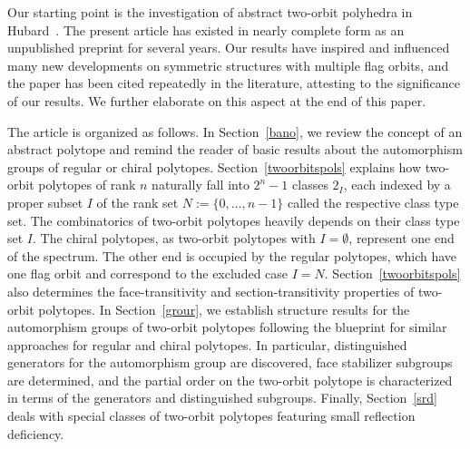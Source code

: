 \documentclass[12pt]{article}
\renewcommand{\>}{\rangle}
\theoremstyle{definition}\newtheorem{definition}{Definition}[section]
\begin{document}

Our starting point is the investigation of abstract two-orbit polyhedra in Hubard~\cite{H2010}. 
The present article has existed in nearly complete form as an unpublished preprint for several years. Our results have inspired and influenced many new developments on symmetric structures with multiple flag orbits, and the paper has been cited repeatedly in the literature, attesting to the significance of our results. We further elaborate on this aspect at the end of this paper.

The article is organized as follows. In Section~\ref{bano}, we review the concept of an abstract polytope and remind the reader of basic results about the automorphism groups of regular or chiral polytopes. Section~\ref{twoorbitspols} explains how two-orbit polytopes of rank $n$ naturally fall into ${2^{n}-1}$ classes $2_I$, each indexed by a proper subset $I$ of the rank set $N:=\{0,\ldots,n-1\}$ called the respective class type set. The combinatorics of two-orbit polytopes heavily depends on their class type set $I$. The chiral polytopes, as two-orbit polytopes with $I=\emptyset$, represent one end of the spectrum. The other end is occupied by the regular polytopes, which have one flag orbit and correspond to the excluded case $I=N$. Section~\ref{twoorbitspols} also determines the face-transitivity and section-transitivity properties of two-orbit polytopes. In Section~\ref{grour}, we establish structure results for the automorphism groups of two-orbit polytopes following the blueprint for similar approaches for regular and chiral polytopes. In particular, distinguished generators for the automorphism group are discovered, face stabilizer subgroups are determined, and the partial order on the two-orbit polytope is characterized in terms of the generators and distinguished subgroups. Finally, Section~\ref{srd} deals with special classes of two-orbit polytopes featuring small reflection deficiency.
\smallskip
\end{document}
